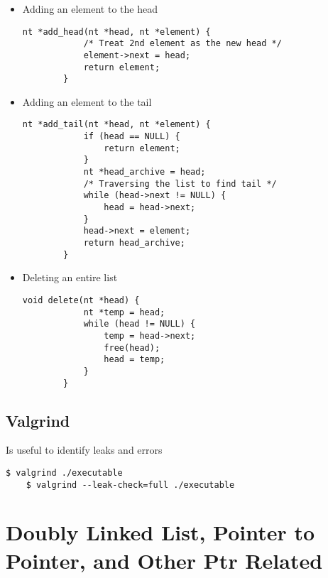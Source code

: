 \documentclass{article}
\begin{document}
\begin{itemize}
    \item Adding an element to the head
    \begin{lstlisting}[style=CStyle]
        nt *add_head(nt *head, nt *element) {
            /* Treat 2nd element as the new head */
            element->next = head;
            return element;
        }
    \end{lstlisting}
    \item Adding an element to the tail
    \begin{lstlisting}[style=CStyle]
        nt *add_tail(nt *head, nt *element) {
            if (head == NULL) {
                return element;
            }
            nt *head_archive = head;
            /* Traversing the list to find tail */
            while (head->next != NULL) {
                head = head->next;
            }
            head->next = element;
            return head_archive;
        }
    \end{lstlisting}
    \item Deleting an entire list
    \begin{lstlisting}[style=CStyle]
        void delete(nt *head) {
            nt *temp = head;
            while (head != NULL) {
                temp = head->next;
                free(head);
                head = temp;
            }
        }
    \end{lstlisting}
\end{itemize}

\subsection{Valgrind}
Is useful to identify leaks and errors
\begin{lstlisting}[style=BashStyle]
    $ valgrind ./executable
    $ valgrind --leak-check=full ./executable
\end{lstlisting}

\section{Doubly Linked List, Pointer to Pointer, and Other Ptr Related}
\end{document}
